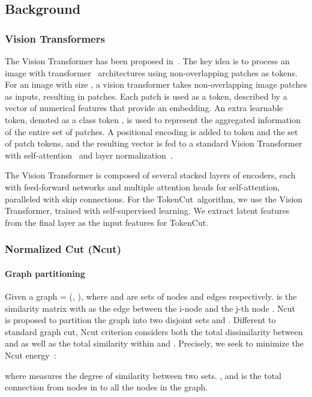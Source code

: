 \documentclass[twocolumn]{article}
\newcommand{\name} {TokenCut}
\begin{document}
\subsection{Background}
\subsubsection{Vision Transformers}
\label{sec:visiontransformers}
The Vision Transformer has been proposed in~\cite{dosovitskiy2020image}. The key idea is to process an image with transformer~\cite{vaswani2017attention} architectures using non-overlapping patches as tokens. For an image with size , a vision transformer takes non-overlapping  image patches as inputs, resulting in  patches. 
Each patch is used as a token, described by a vector of numerical features that provide an embedding. An extra learnable token, denoted as a class token , is used to represent the aggregated information of the entire set of patches. A positional encoding is added to  token and the set of patch tokens, and the resulting vector is fed to a standard Vision Transformer with self-attention~\cite{vaswani2017attention} and layer normalization~\cite{ba2016layer}.

The Vision Transformer is composed of several stacked layers of encoders, each with feed-forward networks and multiple attention heads for self-attention, paralleled with skip connections. 
For the \name~algorithm, we use the Vision Transformer, trained with self-supervised learning. We  extract latent features from the final layer as the input features for \name.


\subsubsection{Normalized Cut (Ncut)}
\label{sec:ncut}
\paragraph*{Graph partitioning} 
Given a graph  = (, ), where  and  are sets of nodes and edges respectively.  is the similarity matrix with  as the edge between the i-node  and the j-th node . Ncut~\cite{shi2000normalized} is proposed to partition the graph into two disjoint sets  and . Different to standard graph cut, 
Ncut criterion considers both the total dissimilarity between  and  as well as the total similarity within  and . Precisely, we seek to minimize the Ncut energy~\cite{shi2000normalized}:


where  measures the degree of similarity between two sets. ,  and  is the total connection from nodes in  to all the nodes in the graph. 
\end{document}
